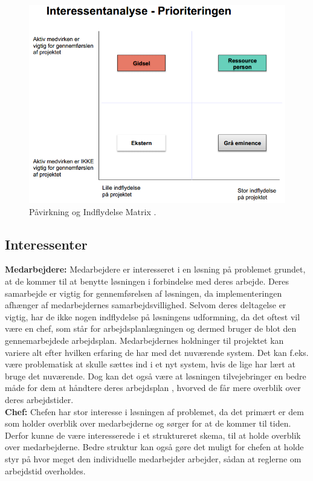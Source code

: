\begin{figure}
    \centering
    \includegraphics[width=1\textwidth]{figures/Udklip.PNG}
    \caption{Påvirkning og Indflydelse Matrix \citep{Holgaard2014}.} 
    \label{fig:PåvirkInflydMat}
\end{figure}

\subsection{Interessenter}
\textbf{Medarbejdere:}
Medarbejdere er interesseret i en løsning på problemet grundet, at de kommer til at benytte løsningen i forbindelse med deres arbejde. Deres samarbejde er vigtig for gennemførelsen af løsningen, da implementeringen afhænger af medarbejdernes samarbejdsvillighed. Selvom deres deltagelse er vigtig, har de ikke nogen indflydelse på løsningens udformning, da det oftest vil være en chef, som står for arbejdsplanlægningen og dermed bruger de blot den gennemarbejdede arbejdsplan. Medarbejdernes holdninger til projektet kan variere alt efter hvilken erfaring de har med det nuværende system. Det kan f.eks. være problematisk at skulle sættes ind i et nyt system, hvis de lige har lært at bruge det nuværende. Dog kan det også være at løsningen tilvejebringer en bedre måde for dem at håndtere deres arbejdsplan , hvorved de får mere overblik over deres arbejdstider.\\

\textbf{Chef:}
Chefen har stor interesse i løsningen af problemet, da det primært er dem som holder overblik over medarbejderne og sørger for at de kommer til tiden. Derfor kunne de være interesserede i et struktureret skema, til at holde overblik over medarbejderne. Bedre struktur kan også gøre det muligt for chefen at holde styr på hvor meget den individuelle medarbejder arbejder, sådan at reglerne om arbejdstid overholdes.\\

